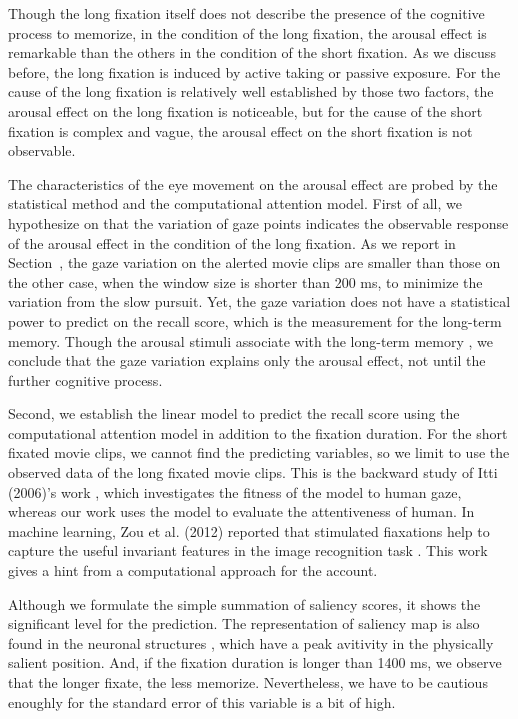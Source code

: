 \documentclass[oneside,master]{snueethesis}
\begin{document}
Though the long fixation itself does not describe the presence of the cognitive process to memorize, in the condition of the long fixation, the arousal effect is remarkable than the others in the condition of the short fixation. As we discuss before, the long fixation is induced by active taking or passive exposure. For the cause of the long fixation is relatively well established by those two factors, the arousal effect on the long fixation is noticeable, but for the cause of the short fixation is complex and vague, the arousal effect on the short fixation is not observable.

The characteristics of the eye movement on the arousal effect are probed by the statistical method and the computational attention model. First of all, we hypothesize on that the variation of gaze points indicates the observable response of the arousal effect in the condition of the long fixation. As we report in Section~, the gaze variation on the alerted movie clips are smaller than those on the other case, when the window size is shorter than 200 ms, to minimize the variation from the slow pursuit. Yet, the gaze variation does not have a statistical power to predict on the recall score, which is the measurement for the long-term memory. Though the arousal stimuli associate with the long-term memory \cite{Cahill1996amyg,Cahill1998baso}, we conclude that the gaze variation explains only the arousal effect, not until the further cognitive process. 

Second, we establish the linear model to predict the recall score using the computational attention model \cite{itti1998model} in addition to the fixation duration. For the short fixated movie clips, we cannot find the predicting variables, so we limit to use the observed data of the long fixated movie clips. This is the backward study of Itti (2006)’s work \cite{Itti2006}, which investigates the fitness of the model to human gaze, whereas our work uses the model to evaluate the attentiveness of human. In machine learning, Zou et al. (2012) reported that stimulated fiaxations help to capture the useful invariant features in the image recognition task \cite{Zou2012}. This work gives a hint from a computational approach for the account.

Although we formulate the simple summation of saliency scores, it shows the significant level for the prediction. The representation of saliency map is also found in the neuronal structures \cite{Fecteau2006}, which have a peak avitivity in the physically salient position. And, if the fixation duration is longer than 1400 ms, we observe that the longer fixate, the less memorize. Nevertheless, we have to be cautious enoughly for the standard error of this variable is a bit of high. 
\end{document}
